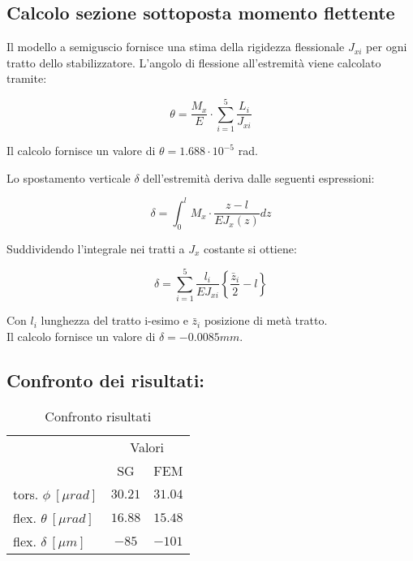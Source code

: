 \documentclass[
10pt, %
a4paper, %
oneside, %
headinclude,footinclude, %
BCOR5mm, %
]{scrartcl}
\begin{document}
\subsection{Calcolo sezione sottoposta momento flettente}

Il modello a semiguscio fornisce una stima della rigidezza flessionale $J_{xi}$ per ogni tratto dello stabilizzatore. L'angolo di flessione all'estremità viene calcolato tramite:


\begin{equation}
\theta = \frac{M_x}{E} \cdot \sum_{i=1}^{5} \frac{L_i}{J_{xi}}
\label{eq:sg_tip_flex}
\end{equation}

Il calcolo fornisce un valore di $\theta = 1.688 \cdot 10^{-5}$ rad.

Lo spostamento verticale $\delta$ dell'estremità deriva dalle seguenti espressioni:

\begin{equation}
\delta = \int_{0}^{l}M_x \cdot \frac{z-l}{EJ_x(z)}dz
\label{eq:sg_tip1}
\end{equation}

Suddividendo l'integrale nei tratti a $J_x$ costante si ottiene:

\begin{equation}
\delta = \sum_{i=1}^{5} \frac{l_i}{EJ_{xi}} \left\{ \frac{\bar{z}_i}{2}  - l  \right\} 
\label{eq:sg_tip2}
\end{equation}

Con $l_i$ lunghezza del tratto i-esimo e $\bar{z}_i$ posizione di metà tratto.\\
Il calcolo fornisce un valore di $\delta = -0.0085mm$.


\subsection{Confronto dei risultati:}

\begin{table}[hbt]
	\caption{Confronto risultati}
	\centering
	\begin{tabular}{lcc}
		\toprule
		& \multicolumn{2}{c}{Valori} \\
		\cmidrule(r){2-3}
		 & SG & FEM \\
		\midrule
		tors. $\phi \ [\mu rad]$ & $30.21$ & $31.04$ \\
		flex. $\theta \ [\mu rad]$ & $16.88$ & $15.48$ \\
		flex. $\delta \ [\mu m]$ & $-85$ & $-101$ \\
		\bottomrule
	\end{tabular}
	\label{tab:comp}
\end{table}
\end{document}
